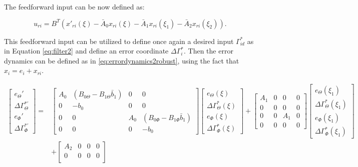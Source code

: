 \documentclass[../main.tex]{subfiles}
\begin{document}
 The feedforward input can be now defined as:

	\begin{equation}
	u_{ri} = B^T (x'_{ri}(\xi) - \bar{A}_0 x_{ri}(\xi) - \bar{A}_1 x_{ri}(\xi_1) - \bar{A}_2 x_{ri}(\xi_2)).
	\label{eq:feedforwardrobust}
	\end{equation}

This feedforward input can be utilized to define once again a desired input $\Gamma_{id}^*$ as in Equation \eqref{eq:filter2} and define an error coordinate $\Delta \Gamma_i^*$. Then the error dynamics can be defined as in \eqref{eq:errordynamics2robust}, using the fact that $x_i = e_i + x_{ri}$.


\begin{align}
\begin{bmatrix}
e_\Theta' \\
\Delta \Gamma_\Theta^{*'} \\
e_\Phi' \\
\Delta \Gamma_\Phi^{*'}
\end{bmatrix} =&
\begin{bmatrix}
A_0 & (B_{0\Theta} - B_{1\Theta} \bar{b}_1) & 0 & 0\\
0 & -b_0 & 0 & 0 \\
0 & 0 & A_0 & (B_{0\Phi} - B_{1\Phi} \bar{b}_1) \\
0 & 0 & 0 & -b_0
\end{bmatrix}
\begin{bmatrix}
e_\Theta(\xi) \\
\Delta \Gamma_\Theta^{*} (\xi) \\
e_\Phi(\xi) \\
\Delta \Gamma_\Phi^{*} (\xi) 
\end{bmatrix} + 
\begin{bmatrix}
A_1 & 0 & 0 & 0\\
0 & 0 & 0 & 0 \\
0 & 0 & A_1 & 0 \\
0 & 0 & 0 & 0 
\end{bmatrix}
\begin{bmatrix}
e_\Theta(\xi_1) \\
\Delta \Gamma_\Theta^{*} (\xi_1) \\
e_\Phi(\xi_1) \\
\Delta \Gamma_\Phi^{*} (\xi_1) 
\end{bmatrix} \nonumber\\
&+
\begin{bmatrix}
A_2 & 0 & 0 & 0\\
0 & 0 & 0 & 0 \\

\end{bmatrix}
\end{align}
\end{document}

